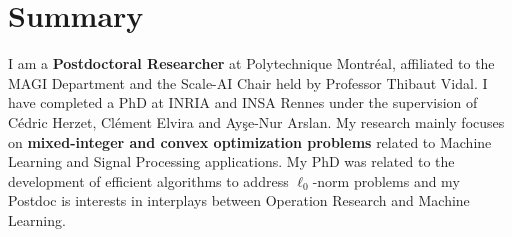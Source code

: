 \section{Summary}

I am a \textbf{Postdoctoral Researcher} at Polytechnique Montréal, affiliated to the MAGI Department and the Scale-AI Chair held by Professor Thibaut Vidal.
I have completed a PhD at INRIA and INSA Rennes under the supervision of Cédric Herzet, Clément Elvira and Ayşe-Nur Arslan.
My research mainly focuses on \textbf{mixed-integer and convex optimization problems} related to Machine Learning and Signal Processing applications.
My PhD was related to the development of efficient algorithms to address $\ell_0$-norm problems and my Postdoc is interests in interplays between Operation Research and Machine Learning.
